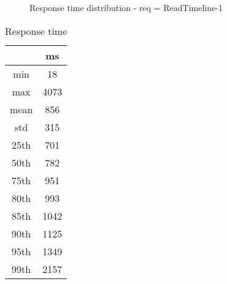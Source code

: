\begin{minipage}{0.75\linewidth}
\begin{figure}[h]
\begin{adjustbox}{max width=1.0\linewidth, keepaspectratio}
  \end{adjustbox}
  \caption{Response time distribution - req = ReadTimeline-1}
\end{figure}
\end{minipage}\hfill\begin{minipage}{0.18\linewidth}
\begin{table}[h]
\begin{tabular}{|cc|}
\hline
\textbf{} & \textbf{ms}\\ \hline
 \Xhline{0.005\arrayrulewidth}
min & 18\\
 \Xhline{0.005\arrayrulewidth}
max & 4073\\
 \Xhline{0.005\arrayrulewidth}
mean & 856\\
 \Xhline{0.005\arrayrulewidth}
std & 315\\
\hline
\hline
 \Xhline{0.005\arrayrulewidth}
25th & 701\\
 \Xhline{0.005\arrayrulewidth}
50th & 782\\
 \Xhline{0.005\arrayrulewidth}
75th & 951\\
 \Xhline{0.005\arrayrulewidth}
80th & 993\\
 \Xhline{0.005\arrayrulewidth}
85th & 1042\\
 \Xhline{0.005\arrayrulewidth}
90th & 1125\\
 \Xhline{0.005\arrayrulewidth}
95th & 1349\\
 \Xhline{0.005\arrayrulewidth}
99th & 2157\\
\hline
\end{tabular}
\caption{Response time}
\end{table}
\end{minipage}\hfill